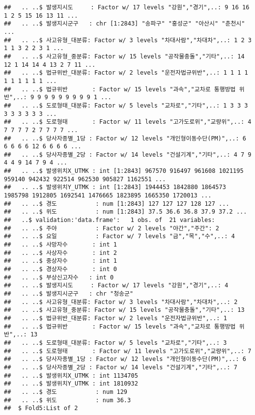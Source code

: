 \documentclass[]{article}
\begin{document}
\begin{verbatim}
##   .. ..$ 발생지시도     : Factor w/ 17 levels "강원","경기",..: 9 16 16 1 2 5 15 16 13 11 ...
##   .. ..$ 발생지시군구   : chr [1:2843] "송파구" "홍성군" "아산시" "춘천시" ...
##   .. ..$ 사고유형_대분류: Factor w/ 3 levels "차대사람","차대차",..: 1 2 3 1 1 3 2 2 3 1 ...
##   .. ..$ 사고유형_중분류: Factor w/ 15 levels "공작물충돌","기타",..: 14 12 1 14 14 4 13 2 7 11 ...
##   .. ..$ 법규위반_대분류: Factor w/ 2 levels "운전자법규위반",..: 1 1 1 1 1 1 1 1 1 1 ...
##   .. ..$ 법규위반       : Factor w/ 15 levels "과속","교차로 통행방법 위반",..: 9 9 9 9 9 9 9 9 9 1 ...
##   .. ..$ 도로형태_대분류: Factor w/ 5 levels "교차로","기타",..: 1 3 3 3 3 3 3 3 3 3 ...
##   .. ..$ 도로형태       : Factor w/ 11 levels "고가도로위","교량위",..: 4 7 7 7 7 2 7 7 7 7 ...
##   .. ..$ 당사자종별_1당 : Factor w/ 12 levels "개인형이동수단(PM)",..: 6 6 6 6 6 12 6 6 6 6 ...
##   .. ..$ 당사자종별_2당 : Factor w/ 14 levels "건설기계","기타",..: 4 7 9 4 4 9 14 7 9 4 ...
##   .. ..$ 발생위치X_UTMK : int [1:2843] 967570 916497 961608 1021195 959140 942432 922514 962530 905827 1162551 ...
##   .. ..$ 발생위치Y_UTMK : int [1:2843] 1944453 1842880 1864573 1985798 1912805 1692541 1476665 1823895 1665350 1720013 ...
##   .. ..$ 경도           : num [1:2843] 127 127 127 128 127 ...
##   .. ..$ 위도           : num [1:2843] 37.5 36.6 36.8 37.9 37.2 ...
##   ..$ validation:'data.frame':   1 obs. of  21 variables:
##   .. ..$ 주야           : Factor w/ 2 levels "야간","주간": 2
##   .. ..$ 요일           : Factor w/ 7 levels "금","목","수",..: 4
##   .. ..$ 사망자수       : int 1
##   .. ..$ 사상자수       : int 2
##   .. ..$ 중상자수       : int 1
##   .. ..$ 경상자수       : int 0
##   .. ..$ 부상신고자수   : int 0
##   .. ..$ 발생지시도     : Factor w/ 17 levels "강원","경기",..: 4
##   .. ..$ 발생지시군구   : chr "청송군"
##   .. ..$ 사고유형_대분류: Factor w/ 3 levels "차대사람","차대차",..: 2
##   .. ..$ 사고유형_중분류: Factor w/ 15 levels "공작물충돌","기타",..: 13
##   .. ..$ 법규위반_대분류: Factor w/ 2 levels "운전자법규위반",..: 1
##   .. ..$ 법규위반       : Factor w/ 15 levels "과속","교차로 통행방법 위반",..: 13
##   .. ..$ 도로형태_대분류: Factor w/ 5 levels "교차로","기타",..: 3
##   .. ..$ 도로형태       : Factor w/ 11 levels "고가도로위","교량위",..: 7
##   .. ..$ 당사자종별_1당 : Factor w/ 12 levels "개인형이동수단(PM)",..: 6
##   .. ..$ 당사자종별_2당 : Factor w/ 14 levels "건설기계","기타",..: 7
##   .. ..$ 발생위치X_UTMK : int 1134705
##   .. ..$ 발생위치Y_UTMK : int 1810932
##   .. ..$ 경도           : num 129
##   .. ..$ 위도           : num 36.3
##  $ Fold5:List of 2

\end{verbatim}
\end{document}
